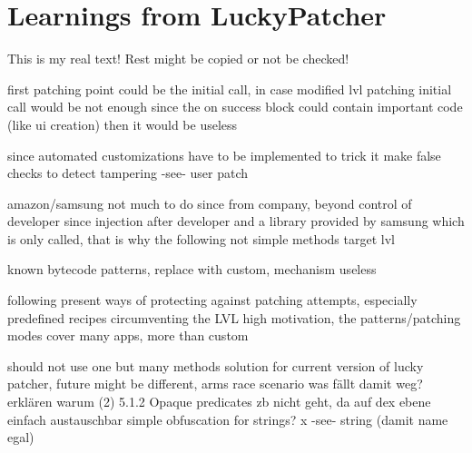\section{Learnings from LuckyPatcher}\label{section:luckypatcher-learnings}
This is my real text! Rest might be copied or not be checked!

%
first patching point could be the initial call, in case modified lvl patching initial call would be not enough since the on success block could contain important code (like ui creation) then it would be useless

since automated customizations have to be implemented to trick it
make false checks to detect tampering -see- user patch

amazon/samsung not much to do since from company, beyond control of developer since injection after developer and a library provided by samsung which is only called, that is why the following not simple methods target lvl

known bytecode patterns, replace with custom, mechanism useless

following present ways of protecting against patching attempts, especially predefined recipes circumventing the LVL
high motivation, the patterns/patching modes cover many apps, more than custom

should not use one but many methods
solution for current version of lucky patcher, future might be different, arms race scenario
\cite{munteanLicense}
%
was fällt damit weg?\newline
erklären warum 	(2) 5.1.2 Opaque predicates zb nicht geht, da auf dex ebene einfach austauschbar\newline
simple obfuscation for strings? x -see- string (damit name egal)
